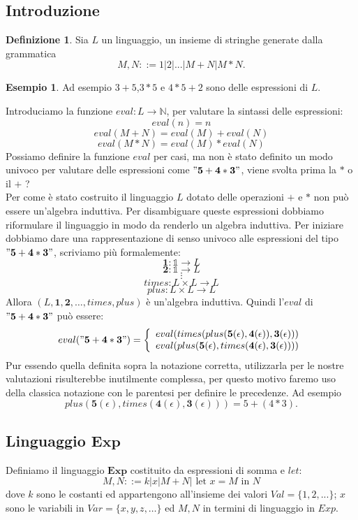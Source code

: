 \documentclass{article}
\theoremstyle{definition}
\theoremstyle{definition}
\theoremstyle{definition}
\newtheorem{definition}[theorem]{Definizione}
\newtheorem{example}[theorem]{Esempio}
\theoremstyle{remark}
\begin{document}
\subsection{Introduzione}
\begin{definition}
    Sia $L$ un linguaggio, un insieme di stringhe generate dalla grammatica
    $$M,N ::= 1|2|...|M+N|M*N.$$
\end{definition}
\begin{example}
    Ad esempio $3+5$,$3*5$ e $4*5+2$ sono delle espressioni di $L$.
\end{example}
Introduciamo la funzione $eval:L\to \mathbb{N}$, per valutare la sintassi delle espressioni:
$$eval(n) = n$$
$$eval(M+N) = eval(M) + eval(N)$$
$$eval(M*N) = eval(M) * eval(N)$$
Possiamo definire la funzione $eval$ per casi, ma non è stato definito un modo univoco per
valutare delle espressioni come $\mathbf{"5+4*3"}$, viene svolta prima la $*$ o il $+$ ?\\ Per come è stato costruito il linguaggio $L$ dotato delle operazioni $+$ e $*$ non può essere un'algebra induttiva. Per disambiguare queste espressioni dobbiamo riformulare  il linguaggio in modo da renderlo un algebra induttiva.
Per iniziare dobbiamo dare una rappresentazione di senso univoco alle espressioni del tipo $\mathbf{"5+4*3"}$, scriviamo più formalemente:
$$\mathbf{1}:\mathds{1}\to L$$
$$\mathbf{2}:\mathds{1}\to L$$
$$\vdots$$
$$times:L\times L\to L$$
$$plus :L\times L\to L$$
Allora $(L,\mathbf{1},\mathbf{2},\dots,times,plus)$ è un'algebra induttiva.
Quindi l'$eval$ di  $\mathbf{"5+4*3"}$ può essere:
$$eval(\mathbf{"5+4*3"}) = \left\{ \begin{array}{cl}
        eval(times(plus(\mathbf{5}(\epsilon),\mathbf{4}(\epsilon)),\mathbf{3}(\epsilon))) \\
        eval(plus(\mathbf{5}(\epsilon),times(\mathbf{4}(\epsilon),\mathbf{3}(\epsilon))))
    \end{array}\right.$$
Pur essendo quella definita sopra la notazione corretta, utilizzarla per le nostre valutazioni risulterebbe
inutilmente complessa, per questo motivo faremo uso della classica notazione con le parentesi per definire le precedenze.
Ad esempio $$plus(\mathbf{5}(\epsilon),times(\mathbf{4}(\epsilon),\mathbf{3}(\epsilon))) = 5+(4*3).$$
\subsection{Linguaggio $\boldsymbol{Exp}$}
Definiamo il linguaggio $\boldsymbol{Exp}$ costituito da espressioni di somma e $let$:
$$ M,N ::= k|x|M+N|\text{ let $x = M$ in $N$}$$
dove $k$ sono le costanti ed appartengono all'insieme dei valori $Val =\{1,2,...\}$; $x$ sono le variabili in $Var=\{x,y,z,\dots\}$ ed $M,N$ in termini di linguaggio in $Exp$.
\end{document}
